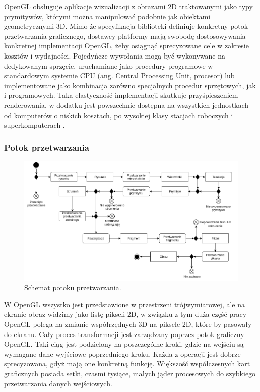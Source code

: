 OpenGL obsługuje aplikacje wizualizacji z obrazami 2D traktowanymi jako typy prymitywów, którymi można manipulować podobnie jak obiektami geometrycznymi 3D. Mimo że specyfikacja biblioteki definiuje konkretny potok przetwarzania graficznego, dostawcy platformy mają swobodę dostosowywania konkretnej implementacji OpenGL, żeby osiągnąć sprecyzowane cele w zakresie kosztów i wydajności. Pojedyńcze wywołania mogą być wykonywane na dedykowanym sprzęcie, uruchamiane jako procedury programowe w standardowym systemie CPU (ang. Central Processing Unit, procesor) lub implementowane jako kombinacja zarówno specjalnych procedur sprzętowych, jak i programowych. Taka elastyczność implementacji skutkuje przyśpieszeniem renderowania, w dodatku jest powszechnie dostępna na wszystkich jednostkach od komputerów o niskich kosztach, po wysokiej klasy stacjach roboczych i superkomputerach \cite{openglofficial}.
\subsubsection{Potok przetwarzania}
\begin{figure}[H]
		\centering
 		\includegraphics[width=15.5cm]{OpenGL.png}
    	\caption{Schemat potoku przetwarzania.}
 		\label{rys7}
\end{figure}
W OpenGL wszystko jest przedstawione w przestrzeni trójwymiarowej, ale na ekranie obraz widzimy jako listę pikseli 2D, w związku z tym duża część pracy OpenGL polega na zmianie współrzędnych 3D na piksele 2D, które by pasowały do ekranu. Cały proces transformacji jest zarządzany poprzez potok graficzny OpenGL. Taki ciąg jest podzielony na poszczególne kroki, gdzie na wejściu są wymagane dane wyjściowe poprzedniego kroku. Każda z operacji jest dobrze sprecyzowana, gdyż mają one konkretną funkcję. Większość współczesnych kart graficznych posiada setki, czasmi tysiące, małych jąder procesowych do szybkiego przetwarzania danych wejściowych.

